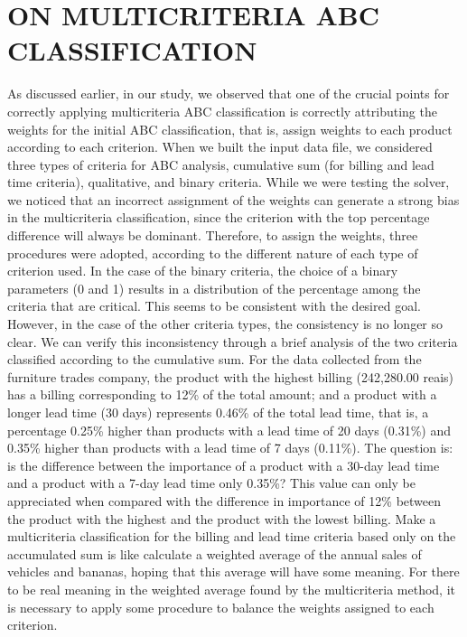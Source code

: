 \documentclass[10pt,fleqn,a4paper,twoside]{article}
\begin{document}
    \section{ON MULTICRITERIA ABC CLASSIFICATION}

As discussed earlier, in our study, we observed that one of the crucial points for correctly applying multicriteria ABC classification is correctly attributing the weights for the initial ABC classification, that is, assign weights to each product according to each criterion. When we built the input data file, we considered three types of criteria for ABC analysis, cumulative sum (for billing and lead time criteria), qualitative, and binary criteria. While we were testing the solver, we noticed that an incorrect assignment of the weights can generate a strong bias in the multicriteria classification, since the criterion with the top percentage difference will always be dominant. Therefore, to assign the weights, three procedures were adopted, according to the different nature of each type of criterion used. In the case of the binary criteria, the choice of a binary parameters (0 and 1) results in a distribution of the percentage among the criteria that are critical. This seems to be consistent with the desired goal. However, in the case of the other criteria types, the consistency is no longer so clear.  We can verify this inconsistency through a brief analysis of the two criteria classified according to the cumulative sum. For the data collected from the furniture trades company, the product with the highest billing (242,280.00 reais) has a billing corresponding to 12\% of the total amount; and a product with a longer lead time (30 days) represents 0.46\% of the total lead time, that is, a percentage 0.25\% higher than products with a lead time of 20 days (0.31\%) and 0.35\% higher than products with a lead time of 7 days (0.11\%). The question is: is the difference between the importance of a product with a 30-day lead time and a product with a 7-day lead time only 0.35\%? This value can only be appreciated when compared with the difference in importance of 12\% between the product with the highest and the product with the lowest billing. Make a multicriteria classification for the billing and lead time criteria based only on the accumulated sum is like calculate a weighted average of the annual sales of vehicles and bananas, hoping that this average will have some meaning. For there to be real meaning in the weighted average found by the multicriteria method, it is necessary to apply some procedure to balance the weights assigned to each criterion.
	
\end{document}
